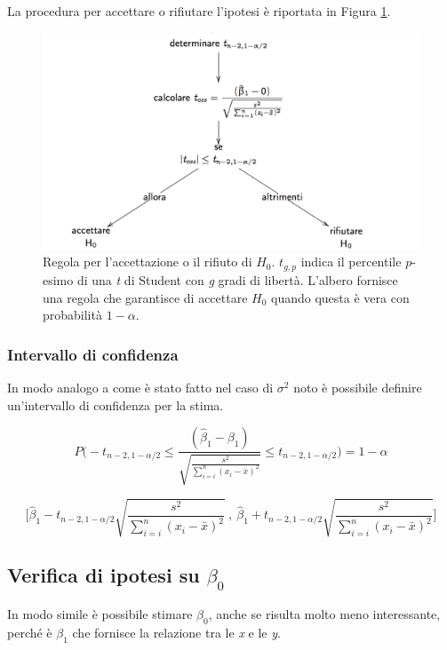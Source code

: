 La procedura per accettare o rifiutare l'ipotesi è riportata in Figura \ref{pvalueacc}.

\begin{figure}[htbp]
\centering
\includegraphics[width=.9\textwidth]{./notes/immagini/l6-fig9-1.png}
\caption{Regola per l'accettazione o il rifiuto di $ H_0 $. $ t_{g,p} $ indica il percentile $ p $-esimo di una \textit{t} di Student con \textit{g} gradi di libertà. L'albero fornisce una regola che garantisce di accettare $ H_0 $ quando questa è vera con probabilità $ 1 - \alpha $.}\label{pvalueacc}
\end{figure}

\subsubsection{Intervallo di confidenza}\label{intevallo-di-confidenza}
In modo analogo a come è stato fatto nel caso di $ \sigma^2 $ noto è possibile definire un'intervallo di confidenza per la stima.

$$
P\Bigg( -t_{n-2, 1-\alpha/2} \leq \frac{(\hat{\beta}_1 - \beta_1)}{\sqrt{\frac{s^2}{\sum_{i=i}^{n} (x_i - \bar{x})^2}}}\leq  t_{n-2, 1-\alpha/2}\Bigg) = 1 - \alpha
$$


$$
\Bigg[ \hat{\beta}_1 - t_{n-2, 1-\alpha/2}  \sqrt{\frac{s^2}{\sum_{i=i}^{n} (x_i - \bar{x})^2}} \:,\: \hat{\beta}_1 + t_{n-2, 1-\alpha/2} \sqrt{\frac{s^2}{\sum_{i=i}^{n} (x_i - \bar{x})^2}}  \Bigg]
$$

\subsection{Verifica di ipotesi su $ \beta_0 $}\label{verifica-di-ipotesi-su-beta0}

In modo simile è possibile stimare $ \beta_0 $, anche se risulta molto meno
interessante, perché è $ \beta_1 $ che fornisce la relazione tra le \emph{x} e
le \emph{y}.

